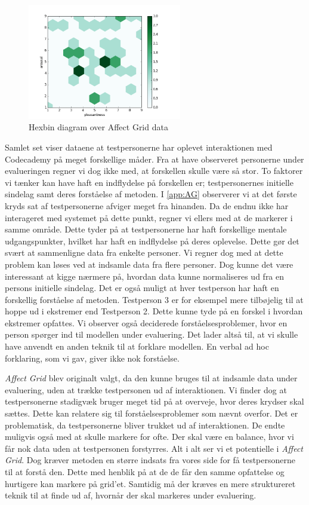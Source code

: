 \begin{figure}[h]
\centering
\includegraphics[width=0.6\textwidth]{hexbin.png}
\caption{Hexbin diagram over Affect Grid data}
\label{fig:hexbin}
\end{figure}

Samlet set viser dataene at testpersonerne har oplevet interaktionen med Codecademy på meget forskellige måder. Fra at have observeret personerne under evalueringen regner vi dog ikke med, at forskellen skulle være så stor. To faktorer vi tænker kan have haft en indflydelse på forskellen er; testpersonernes initielle sindelag samt deres forståelse af metoden.
I \cref{app:AG} observerer vi at det første kryds sat af testpersonerne afviger meget fra hinanden. Da de endnu ikke har interageret med systemet på dette punkt, regner vi ellers med at de markerer i samme område. Dette tyder på at testpersonerne har haft forskellige mentale udgangspunkter, hvilket har haft en indflydelse på deres oplevelse. Dette gør det svært at sammenligne data fra enkelte personer. Vi regner dog med at dette problem kan løses ved at indsamle data fra flere personer. Dog kunne det være interessant at kigge nærmere på, hvordan data kunne normaliseres ud fra en persons initielle sindelag.
Det er også muligt at hver testperson har haft en forskellig forståelse af metoden. Testperson 3 er for eksempel mere tilbøjelig til at hoppe ud i ekstremer end Testperson 2. Dette kunne tyde på en forskel i hvordan ekstremer opfattes. Vi observer også deciderede forståelsesproblemer, hvor en person spørger ind til modellen under evaluering. Det lader altså til, at vi skulle have anvendt en anden teknik til at forklare modellen. En verbal ad hoc forklaring, som vi gav, giver ikke nok forståelse. 

\textit{Affect Grid} blev originalt valgt, da den kunne bruges til at indsamle data under evaluering, uden at trække testpersonen ud af interaktionen. Vi finder dog at testpersonerne stadigvæk bruger meget tid på at overveje, hvor deres krydser skal sættes. Dette kan relatere sig til forståelsesproblemer som nævnt overfor. Det er problematisk, da testpersonerne bliver trukket ud af interaktionen. De endte muligvis også med at skulle markere for ofte. Der skal være en balance, hvor vi får nok data uden at testpersonen forstyrres. 
Alt i alt ser vi et potentielle i \textit{Affect Grid}. Dog kræver metoden en større indsats fra vores side for få testpersonerne til at forstå den. Dette med henblik på at de de får den samme opfattelse og hurtigere kan markere på grid'et. Samtidig må der kræves en mere struktureret teknik til at finde ud af, hvornår der skal markeres under evaluering.  

